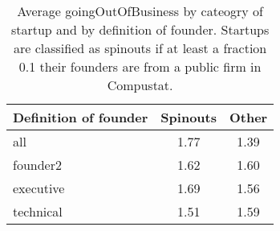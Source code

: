 \begin{table}[!htb]
\centering
\begingroup\small
\begin{tabular}{p{1.5cm}cc}
  \toprule
Definition of founder & Spinouts & Other \\ 
  \midrule
all & 1.77 & 1.39 \\ 
  founder2 & 1.62 & 1.60 \\ 
  executive & 1.69 & 1.56 \\ 
  technical & 1.51 & 1.59 \\ 
   \bottomrule
\end{tabular}
\endgroup
\caption{Average goingOutOfBusiness by cateogry of startup and by definition of founder. Startups are classified as spinouts if at least a fraction 0.1 their founders are from a public firm in Compustat.} 
\label{table:raw_comparison_goingOutOfBusiness}
\end{table}
